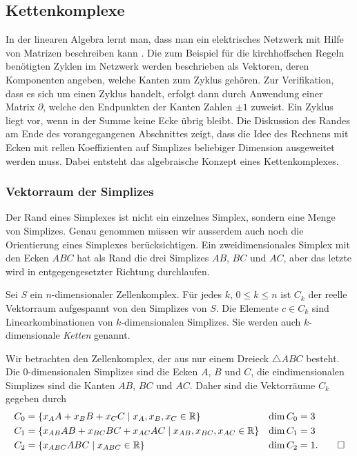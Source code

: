 %
%
\subsection{Kettenkomplexe
\label{buch:topologie:subsection:kettenkomplexe}}
In der linearen Algebra lernt man, dass man ein elektrisches
Netzwerk mit Hilfe von Matrizen beschreiben kann
\cite[Abschnitt~2.A]{buch:linalg}.
Die zum Beispiel für die kirchhoffschen Regeln benötigten Zyklen
im Netzwerk werden beschrieben als Vektoren, deren Komponenten angeben,
welche Kanten zum Zyklus gehören.
Zur Verifikation, dass es sich um einen Zyklus handelt, erfolgt dann
durch Anwendung einer Matrix $\partial$, welche den Endpunkten der
Kanten Zahlen $\pm 1$ zuweist.
Ein Zyklus liegt vor, wenn in der Summe keine Ecke übrig bleibt.
Die Diskussion des Randes am Ende des vorangegangenen Abschnittes
zeigt, dass die Idee des Rechnens mit Ecken mit rellen Koeffizienten 
auf Simplizes beliebiger Dimension ausgeweitet werden muss.
Dabei entsteht das algebraische Konzept eines Kettenkomplexes.

%
%
\subsubsection{Vektorraum der Simplizes}
Der Rand eines Simplexes ist nicht ein einzelnes Simplex, sondern
eine Menge von Simplizes.
Genau genommen müssen wir ausserdem auch noch die Orientierung eines
Simplexes berücksichtigen.
Ein zweidimensionales Simplex mit den Ecken $ABC$ hat als Rand
die drei Simplizes $AB$, $BC$ und $AC$, aber das letzte wird in
entgegengesetzter Richtung durchlaufen.

\begin{definition}
Sei $S$ ein $n$-dimensionaler Zellenkomplex.
Für jedes $k$, $0\le k\le n$ ist $C_k$ der reelle Vektorraum aufgespannt
von den Simplizes von $S$.
Die Elemente $c\in C_k$ sind Linearkombinationen von $k$-dimensionalen
Simplizes.
Sie werden auch $k$-dimensionale \emph{Ketten} genannt.
%
\end{definition}

\begin{beispiel}
\label{buch:topologie:eulercharakteristik:bsp:dreieck}
Wir betrachten den Zellenkomplex, der aus nur einem Dreieck
$\triangle ABC$ besteht.
Die $0$-dimensionalen Simplizes sind die Ecken $A$, $B$ und $C$, 
die eindimensionalen Simplizes sind die Kanten $AB$, $BC$ und $AC$.
Daher sind die Vektorräume $C_k$ gegeben durch
\begin{align*}
C_0 &= \{ x_A A + x_B B + x_C C\mid x_A, x_B, x_C\in\mathbb{R}\}
&
\dim C_0 &= 3
\\
C_1 &= \{ x_{AB} AB + x_{BC} BC + x_{AC} AC\mid x_{AB}, x_{BC}, x_{AC} \in\mathbb{R}\}
&
\dim C_1 &= 3
\\
C_2 &= \{ x_{ABC} ABC\mid x_{ABC}\in\mathbb{R}\}
&
\dim C_2 &= 1.
\qedhere
\end{align*}
\end{beispiel}

